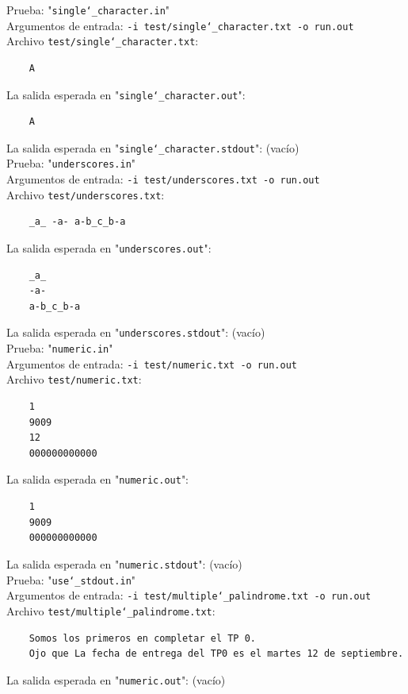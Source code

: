 \documentclass[a4paper,10pt]{article}
\begin{document}
    
    Prueba: "\texttt{single\char`_character.in}" \\
    Argumentos de entrada: \texttt{-i test/single\char`_character.txt -o run.out}\\
    Archivo \texttt{test/single\char`_character.txt}: \\
    \begin{Verbatim}
    A
    \end{Verbatim}
    La salida esperada en "\texttt{single\char`_character.out}":\\
        \begin{Verbatim}
    A
    \end{Verbatim}
    La salida esperada en "\texttt{single\char`_character.stdout}": (vacío)\\
    
    
    Prueba: "\texttt{underscores.in}" \\
    Argumentos de entrada: \texttt{-i test/underscores.txt -o run.out}\\
    Archivo \texttt{test/underscores.txt}: \\
    \begin{Verbatim}
    _a_ -a- a-b_c_b-a
    \end{Verbatim}
    La salida esperada en "\texttt{underscores.out}":\\
        \begin{Verbatim}
    _a_
    -a-
    a-b_c_b-a
    \end{Verbatim}
    La salida esperada en "\texttt{underscores.stdout}": (vacío)\\
    
        Prueba: "\texttt{numeric.in}" \\
    Argumentos de entrada: \texttt{-i test/numeric.txt -o run.out}\\
    Archivo \texttt{test/numeric.txt}: \\
    \begin{Verbatim}
    1
    9009
    12
    000000000000
    \end{Verbatim}
    La salida esperada en "\texttt{numeric.out}":\\
        \begin{Verbatim}
    1
    9009
    000000000000
    \end{Verbatim}
    La salida esperada en "\texttt{numeric.stdout}": (vacío)\\
    
        Prueba: "\texttt{use\char`_stdout.in}" \\
    Argumentos de entrada: \texttt{-i test/multiple\char`_palindrome.txt -o run.out}\\
    Archivo \texttt{test/multiple\char`_palindrome.txt}: \\
    \begin{Verbatim}
    Somos los primeros en completar el TP 0.
    Ojo que La fecha de entrega del TP0 es el martes 12 de septiembre.
    \end{Verbatim}
    La salida esperada en "\texttt{numeric.out}": (vacío)\\
\end{document}
